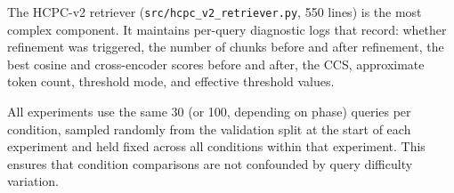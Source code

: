The HCPC-v2 retriever (\texttt{src/hcpc\_v2\_retriever.py}, 550 lines)
is the most complex component. It maintains per-query diagnostic logs
that record: whether refinement was triggered, the number of chunks
before and after refinement, the best cosine and cross-encoder scores
before and after, the CCS, approximate token count, threshold mode,
and effective threshold values.

All experiments use the same 30 (or 100, depending on phase) queries per
condition, sampled randomly from the validation split at the start of
each experiment and held fixed across all conditions within that
experiment. This ensures that condition comparisons are not confounded
by query difficulty variation.
